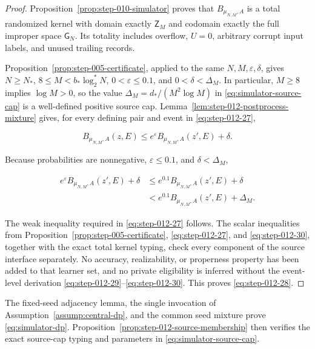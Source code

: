 \begin{proof}
Proposition~\ref{prop:step-010-simulator} proves that
\(B_{\mu_{N,M},A}\) is a total randomized kernel with domain exactly
\(\mathsf Z_M\) and codomain exactly the full improper space
\(\mathsf G_N\).  Its totality includes overflow, \(U=0\), arbitrary
corrupt input labels, and unused trailing records.

Proposition~\ref{prop:step-005-certificate}, applied to the same
\(N,M,\varepsilon,\delta\), gives
$N\ge N_*$, $8\le M<b_*\log_2^*N$,
$0<\varepsilon\le0.1$, and $0<\delta<\Delta_M$.  In particular,
\(M\ge8\) implies \(\log M>0\), so the value
\(\Delta_M=d_*/(M^2\log M)\) in
\eqref{eq:simulator-source-cap} is a well-defined positive source cap.
Lemma~\ref{lem:step-012-postprocess-mixture} gives, for every
defining pair and event in \eqref{eq:step-012-27},

\[
  B_{\mu_{N,M},A}(z,E)
  \le e^\varepsilon B_{\mu_{N,M},A}(z',E)+\delta.
\tag{S12.29}\label{eq:step-012-29}
\]

Because probabilities are nonnegative, \(\varepsilon\le0.1\), and
\(\delta<\Delta_M\),

\[
\begin{aligned}
  e^\varepsilon B_{\mu_{N,M},A}(z',E)+\delta
  &\le e^{0.1}B_{\mu_{N,M},A}(z',E)+\delta\\
  &< e^{0.1}B_{\mu_{N,M},A}(z',E)+\Delta_M.
\end{aligned}
\tag{S12.30}\label{eq:step-012-30}
\]

The weak inequality required in \eqref{eq:step-012-27} follows.  The scalar
inequalities from Proposition~\ref{prop:step-005-certificate},
\eqref{eq:step-012-27}, and
\eqref{eq:step-012-30}, together with the exact total kernel typing, check every component
of the source interface separately.  No accuracy, realizability, or
properness property has been added to that learner set, and no private
eligibility is inferred without the event-level derivation \eqref{eq:step-012-29}--\eqref{eq:step-012-30}.
This proves \eqref{eq:step-012-28}. \end{proof}
The fixed-seed adjacency lemma, the single invocation of
Assumption~\ref{assump:central-dp}, and the common seed mixture prove
\eqref{eq:simulator-dp}.  Proposition~\ref{prop:step-012-source-membership}
then verifies the exact source-cap typing and parameters in
\eqref{eq:simulator-source-cap}.

